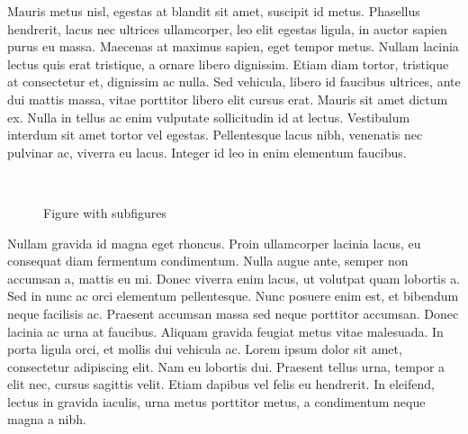 Mauris metus nisl, egestas at blandit sit amet, suscipit id metus. Phasellus hendrerit, lacus nec ultrices ullamcorper, leo elit egestas ligula, in auctor sapien purus eu massa. Maecenas at maximus sapien, eget tempor metus. Nullam lacinia lectus quis erat tristique, a ornare libero dignissim. Etiam diam tortor, tristique at consectetur et, dignissim ac nulla. Sed vehicula, libero id faucibus ultrices, ante dui mattis massa, vitae porttitor libero elit cursus erat. Mauris sit amet dictum ex. Nulla in tellus ac enim vulputate sollicitudin id at lectus. Vestibulum interdum sit amet tortor vel egestas. Pellentesque lacus nibh, venenatis nec pulvinar ac, viverra eu lacus. Integer id leo in enim elementum faucibus. 

\begin{figure}
\centering
{}
~
\caption{Figure with subfigures}
\end{figure}


 Nullam gravida id magna eget rhoncus. Proin ullamcorper lacinia lacus, eu consequat diam fermentum condimentum. Nulla augue ante, semper non accumsan a, mattis eu mi. Donec viverra enim lacus, ut volutpat quam lobortis a. Sed in nunc ac orci elementum pellentesque. Nunc posuere enim est, et bibendum neque facilisis ac. Praesent accumsan massa sed neque porttitor accumsan. Donec lacinia ac urna at faucibus. Aliquam gravida feugiat metus vitae malesuada. In porta ligula orci, et mollis dui vehicula ac. Lorem ipsum dolor sit amet, consectetur adipiscing elit. Nam eu lobortis dui. Praesent tellus urna, tempor a elit nec, cursus sagittis velit. Etiam dapibus vel felis eu hendrerit. In eleifend, lectus in gravida iaculis, urna metus porttitor metus, a condimentum neque magna a nibh.
 
 

